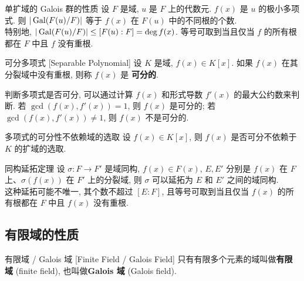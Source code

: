         \begin{ppt}
            {单扩域的 Galois 群的性质}
            设 \(F\) 是域, \(u\) 是 \(F\) 上的代数元. \(f(x)\) 是 \(u\) 的极小多项式. 则 \(|\operatorname{Gal}(F(u)/F)|\) 等于 \(f(x)\) 在 \(F(u)\) 中的不同根的个数.\\
            特别地, \(|\operatorname{Gal}(F(u)/F)|\leq[F(u):F]=\deg f(x)\). 等号可取到当且仅当 \(f\) 的所有根都在 \(F\) 中且 \(f\) 没有重根.
        \end{ppt}

        \begin{dfn}
            {可分多项式}
            [Separable Polynomial]
            设 \(K\) 是域, \(f(x)\in K[x]\). 如果 \(f(x)\) 在其分裂域中没有重根, 则称 \(f(x)\) 是 \textbf{可分的}.
        \end{dfn}

        \begin{rmk}
            判断多项式是否可分, 可以通过计算 \(f(x)\) 和形式导数 \(f'(x)\) 的最大公约数来判断. 若 \(\gcd(f(x), f'(x))=1\), 则 \(f(x)\) 是可分的; 若 \(\gcd(f(x), f'(x))\neq 1\), 则 \(f(x)\) 不是可分的.
        \end{rmk}

        \begin{thm}
            {多项式的可分性不依赖域的选取}
            设 \(f(x)\in K[x]\), 则 \(f(x)\) 是否可分不依赖于 \(K\) 的扩域的选取.
        \end{thm}

        \begin{thm}
            {同构延拓定理}
            设 \(\sigma:F\to F'\) 是域同构, \(f(x)\in F(x)\), \(E,E'\) 分别是 \(f(x)\) 在 \(F\) 上、\(\sigma(f(x))\) 在 \(F'\) 上的分裂域, 则 \(\sigma\) 可以延拓为 \(E\) 和 \(E'\) 之间的域同构.\\
            这种延拓可能不唯一, 其个数不超过 \([E:F]\), 且等号可取到当且仅当 \(f(x)\) 的所有根都在 \(F\) 中且 \(f(x)\) 没有重根.
        \end{thm}

    \subsection{有限域的性质}

        \begin{dfn}
            {有限域 / Galois 域}
            [Finite Field / Galois Field]
            只有有限多个元素的域叫做\textbf{有限域} (finite field), 也叫做\textbf{Galois 域} (Galois field).
        \end{dfn}


